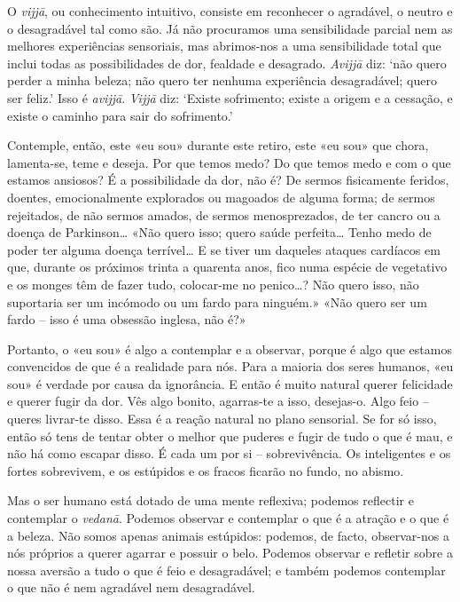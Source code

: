 O \emph{vijjā}, ou conhecimento intuitivo, consiste em reconhecer o agradável, o
neutro e o desagradável tal como são. Já não procuramos uma sensibilidade
parcial nem as melhores experiências sensoriais, mas abrimos-nos a uma
sensibilidade total que inclui todas as possibilidades de dor, fealdade e
desagrado. \emph{Avijjā} diz: `não quero perder a minha beleza; não quero ter
nenhuma experiência desagradável; quero ser feliz.' Isso é \emph{avijjā}.
\emph{Vijjā} diz: `Existe sofrimento; existe a origem e a cessação, e existe o
caminho para sair do sofrimento.'

Contemple, então, este «eu sou» durante este retiro, este «eu sou» que chora,
lamenta-se, teme e deseja. Por que temos medo? Do que temos medo e com o que
estamos ansiosos? É a possibilidade da dor, não é? De sermos fisicamente
feridos, doentes, emocionalmente explorados ou magoados de alguma forma; de
sermos rejeitados, de não sermos amados, de sermos menosprezados, de ter cancro
ou a doença de Parkinson\ldots{} «Não quero isso; quero saúde perfeita\ldots{}
Tenho medo de poder ter alguma doença terrível\ldots{} E se tiver um daqueles
ataques cardíacos em que, durante os próximos trinta a quarenta anos, fico numa
espécie de vegetativo e os monges têm de fazer tudo, colocar-me no
penico\ldots{}? Não quero isso, não suportaria ser um incómodo ou um fardo para
ninguém.» «Não quero ser um fardo -- isso é uma obsessão inglesa, não é?»

Portanto, o «eu sou» é algo a contemplar e a observar, porque é algo que estamos
convencidos de que é a realidade para nós. Para a maioria dos seres humanos, «eu
sou» é verdade por causa da ignorância. E então é muito natural querer
felicidade e querer fugir da dor. Vês algo bonito, agarras-te a isso,
desejas-o. Algo feio -- queres livrar-te disso. Essa é a reação natural no
plano sensorial. Se for só isso, então só tens de tentar obter o melhor que
puderes e fugir de tudo o que é mau, e não há como escapar disso. É cada um por
si -- sobrevivência. Os inteligentes e os fortes sobrevivem, e os estúpidos e os
fracos ficarão no fundo, no abismo.

Mas o ser humano está dotado de uma mente reflexiva; podemos reflectir e
contemplar o \emph{vedanā}. Podemos observar e contemplar o que é a atração e o
que é a beleza. Não somos apenas animais estúpidos: podemos, de facto,
observar-nos a nós próprios a querer agarrar e possuir o belo. Podemos observar
e refletir sobre a nossa aversão a tudo o que é feio e desagradável; e também
podemos contemplar o que não é nem agradável nem desagradável.

